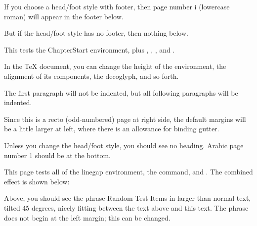 \documentclass[test]{novel} %
\begin{document}
\frontmatter %

\thispagestyle{footer}
\vspace*{5\nbs}
\begin{center}
\par
\vspace{1.5\nbs}
\par
\vspace{4\nbs}
\vspace{2\nbs}
\par
\vfill
If you choose a head/foot style with footer, then page number i (lowercase roman) will appear in the footer below.\par
But if the head/foot style has no footer, then nothing below.\par
\end{center}
\clearpage


\mainmatter

\begin{ChapterStart}[10]
\vspace*{3\nbs}
\end{ChapterStart}

This tests the ChapterStart environment, plus \string\ChapterTitle, \string\ChapterSubtitle, \string\ChapterDeco, and \string\decoglyph.

In the TeX document, you can change the height of the environment, the alignment of its components, the decoglyph, and so forth.

The first paragraph will not be indented, but all following paragraphs will be indented.

Since this is a recto (odd-numbered) page at right side, the default margins will be a little larger at left, where there is an allowance for binding gutter.

Unless you change the head/foot style, you should see no heading. Arabic page number 1 should be at the bottom.

\clearpage



This page tests all of the linegap environment, the \string\charscale\space command, and \string\rotatebox. The combined effect is shown below:
\begin{linegap}{10}
\vspace{1.5\nbs}
\end{linegap}
Above, you should see the phrase Random Test Items in larger than normal text, tilted 45 degrees, nicely fitting between the text above and this text.  The phrase does not begin at the left margin; this can be changed.
\end{document}
